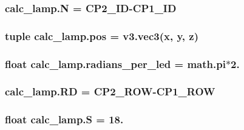 \subsubsection[{N}]{\setlength{\rightskip}{0pt plus 5cm}calc\+\_\+lamp.\+N = C\+P2\+\_\+\+I\+D-\/C\+P1\+\_\+\+I\+D}\label{namespacecalc__lamp_a9fcf41a6d23f2cb5a91b8f0662ade78e}
\hypertarget{namespacecalc__lamp_a7cb8bc15da13759da2aa07dc77cf13fe}{}
\subsubsection[{pos}]{\setlength{\rightskip}{0pt plus 5cm}tuple calc\+\_\+lamp.\+pos = {\bf v3.\+vec3}({\bf x}, {\bf y}, {\bf z})}\label{namespacecalc__lamp_a7cb8bc15da13759da2aa07dc77cf13fe}
\hypertarget{namespacecalc__lamp_a293f8c6e4a3571865e0d87bdaeb52aec}{}
\subsubsection[{radians\+\_\+per\+\_\+led}]{\setlength{\rightskip}{0pt plus 5cm}float calc\+\_\+lamp.\+radians\+\_\+per\+\_\+led = math.\+pi$\ast$2.}\label{namespacecalc__lamp_a293f8c6e4a3571865e0d87bdaeb52aec}
\hypertarget{namespacecalc__lamp_a24423a34de7058a469e65e72013909e3}{}
\subsubsection[{R\+D}]{\setlength{\rightskip}{0pt plus 5cm}calc\+\_\+lamp.\+R\+D = C\+P2\+\_\+\+R\+O\+W-\/C\+P1\+\_\+\+R\+O\+W}\label{namespacecalc__lamp_a24423a34de7058a469e65e72013909e3}
\hypertarget{namespacecalc__lamp_a67f8a48b282bb1df37dbef674da6c70c}{}
\subsubsection[{S}]{\setlength{\rightskip}{0pt plus 5cm}float calc\+\_\+lamp.\+S = 18.}\label{namespacecalc__lamp_a67f8a48b282bb1df37dbef674da6c70c}
\hypertarget{namespacecalc__lamp_aa8ac454a435aa87a128701d48e86b265}{}
